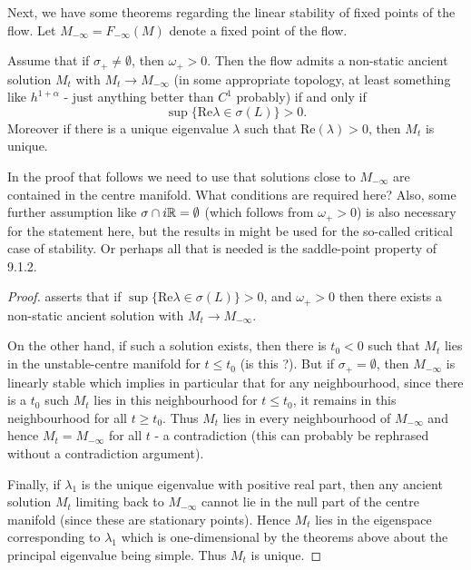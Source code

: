 \documentclass{amsart}
\begin{document}
Next, we have some theorems regarding the linear stability of fixed points of the flow. Let \(M_{-\infty} = F_{-\infty}(M)\) denote a fixed point of the flow.

\begin{thm}
Assume that if \(\sigma_+ \ne \emptyset\), then \(\omega_+ > 0\). Then the flow admits a non-static ancient solution \(M_t\) with \(M_t \to M_{-\infty}\) (in some appropriate topology, at least something like \(h^{1+\alpha}\) - just anything better than \(C^1\) probably) if and only if
\[
\sup \{\text{Re}\lambda \in \sigma(L)\} > 0.
\]
Moreover if there is a unique eigenvalue \(\lambda\) such that \(\text{Re}(\lambda) > 0\), then \(M_t\) is unique.
\end{thm}

\begin{rem}
In the proof that follows we need to use that solutions close to \(M_{-\infty}\) are contained in the centre manifold. What conditions are required here? Also, some further assumption like \(\sigma \cap i\mathbb{R} = \emptyset\) (which follows from \(\omega_+ > 0\)) is also necessary for the statement here, but the results in \cite[Section 9.2]{lunardi2012analytic} might be used for the so-called critical case of stability. Or perhaps all that is needed is the saddle-point property of 9.1.2.
\end{rem}

\begin{proof}
\cite[Theorem 9.1.3]{lunardi2012analytic} asserts that if \(\sup \{\text{Re}\lambda \in \sigma(L)\} > 0\), and \(\omega_+ > 0\) then there exists a non-static ancient solution with \(M_t \to M_{-\infty}\).

On the other hand, if such a solution exists, then there is \(t_0 < 0\) such that \(M_t\) lies in the unstable-centre manifold for \(t \leq t_0\) (is this \cite[Theorem 9.1.4]{lunardi2012analytic}?). But if \(\sigma_+ = \emptyset\), then \(M_{-\infty}\) is linearly stable which implies in particular that for any neighbourhood, since there is a \(t_0\) such \(M_t\) lies in this neighbourhood for \(t \leq t_0\), it remains in this neighbourhood for all \(t \geq t_0\). Thus \(M_t\) lies in every neighbourhood of \(M_{-\infty}\) and hence \(M_t = M_{-\infty}\) for all \(t\) - a contradiction (this can probably be rephrased without a contradiction argument).

Finally, if \(\lambda_1\) is the unique eigenvalue with positive real part, then any ancient solution \(M_t\) limiting back to \(M_{-\infty}\) cannot lie in the null part of the centre manifold (since these are stationary points). Hence \(M_t\) lies in the eigenspace corresponding to \(\lambda_1\) which is one-dimensional by the theorems above about the principal eigenvalue being simple. Thus \(M_t\) is unique.
\end{proof}
\end{document}
